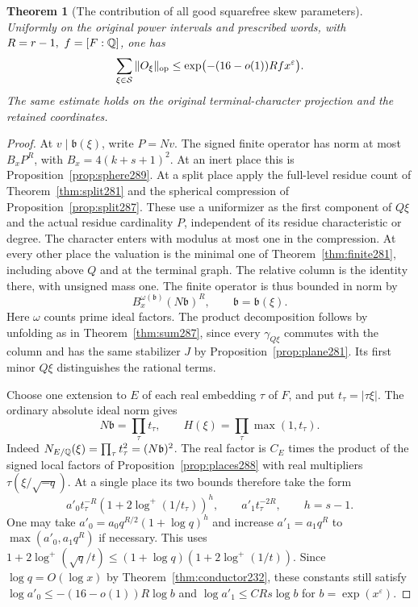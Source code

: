 \documentclass[a4paper,11pt]{article}
\newtheorem{theorem}[proposition]{Theorem}
\theoremstyle{definition}
\theoremstyle{remark}
\numberwithin{equation}{section}
\begin{document}
\begin{theorem}[The contribution of all good squarefree skew parameters]\leavevmode
\label{thm:skew289}
Uniformly on the original power intervals and prescribed words,
with \(R=r-1,\ f=[F:\QQ]\), one has
\[
           \sum_{\xi\in\mathcal S}\|O_\xi\|_{\rm op}
             \le \exp\bigl(-(16-o(1))Rf x^\varepsilon\bigr).
\]
The same estimate holds on the original terminal-character
projection and the retained coordinates.
\end{theorem}
\begin{proof}
At \(v\mid\mathfrak b(\xi)\), write \(P=Nv\). The signed
finite operator has norm at most \(B_xP^R\), with
\(B_x=4(k+s+1)^2\). At an inert place this is
Proposition~\ref{prop:sphere289}. At a split place apply
the full-level residue count of Theorem~\ref{thm:split281}
and the spherical compression of Proposition~\ref{prop:split287}.
These use a uniformizer as the first component of \(Q\xi\)
and the actual residue cardinality \(P\), independent of
its residue characteristic or degree. The character enters
with modulus at most one in the compression. At every other
place the valuation is the minimal one of
Theorem~\ref{thm:finite281}, including above \(Q\) and at the
terminal graph. The relative column is the identity there,
with unsigned mass one. The finite operator is thus bounded
in norm by
\[
               B_x^{\omega(\mathfrak b)}(N\mathfrak b)^R ,
               \qquad \mathfrak b=\mathfrak b(\xi).
\]
Here \(\omega\) counts prime ideal factors. The product
decomposition follows by unfolding as in
Theorem~\ref{thm:sum287}, since every \(\gamma_{Q\xi}\)
commutes with the column and has the same stabilizer \(J\)
by Proposition~\ref{prop:plane281}. Its first minor \(Q\xi\)
distinguishes the rational terms.

Choose one extension to \(E\) of each real embedding \(\tau\)
of \(F\), and put \(t_\tau=|\tau\xi|\). The ordinary absolute
ideal norm gives
\[
        N\mathfrak b=\prod_\tau t_\tau,\qquad
        H(\xi)=\prod_\tau\max(1,t_\tau).
\]
Indeed \(N_{E/\mathbb Q}(\xi)=\prod_\tau t_\tau^2=(N\mathfrak b)^2\).
The real factor is \(C_E\) times the product of the signed
local factors of Proposition~\ref{prop:places288} with real
multipliers \(\tau(\xi/\sqrt{-q})\). At a single place its
two bounds therefore take the form
\[
  a'_0 t_\tau^{-R}(1+2\log^+(1/t_\tau))^{h},
       \qquad a'_1 t_\tau^{-2R},\qquad h=s-1 .
\]
One may take \(a'_0=a_0q^{R/2}(1+\log q)^h\) and increase
\(a'_1=a_1 q^R\) to \(\max(a'_0,a_1q^R)\) if necessary.
This uses \(1+2\log^+(\sqrt q/t)
\le(1+\log q)(1+2\log^+(1/t))\).
Since \(\log q=O(\log x)\) by Theorem~\ref{thm:conductor232},
these constants still satisfy
\(\log a'_0\le-(16-o(1))R\log b\) and
\(\log a'_1\le C R s\log b\) for \(b=\exp(x^\varepsilon)\).


\end{proof}
\end{document}
